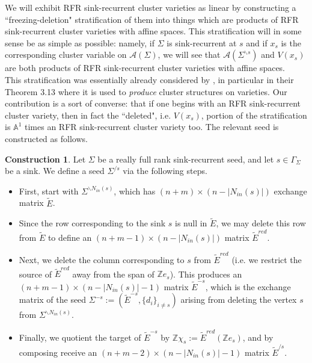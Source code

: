 \documentclass[11pt]{amsart}
\theoremstyle{definition}
\newtheorem{con}[thm]{Construction}
\theoremstyle{remark}
\numberwithin{equation}{section}
\begin{document}
We will exhibit RFR sink-recurrent cluster varieties as linear by constructing a ``freezing-deletion" stratification of them into things which are products of RFR sink-recurrent cluster varieties with affine spaces. This stratification will in some sense be as simple as possible: namely, if $\Sigma$ is sink-recurrent at $s$ and if $x_s$ is the corresponding cluster variable on $\mathcal{A}(\Sigma)$, we will see that $\mathcal{A}(\Sigma^{\backslash s})$ and $V(x_s)$ are both products of RFR sink-recurrent cluster varieties with affine spaces.\\

This stratification was essentially already considered by \cite{galashin2026braid}, in particular in their Theorem 3.13 where it is used to \textit{produce} cluster structures on varieties. Our contribution is a sort of converse: that if one begins with an RFR sink-recurrent cluster variety, then in fact the ``deleted", i.e. $V(x_s)$, portion of the stratification is $\mathbb{A}^1$ times an RFR sink-recurrent cluster variety too. The relevant seed is constructed as follows.

\begin{con}
    Let $\Sigma$ be a really full rank sink-recurrent seed, and let $s \in \Gamma_\Sigma$ be a sink. We define a seed $\Sigma^{/s}$ via the following steps.

    \begin{itemize}
        \item First, start with $\Sigma^{\backslash N_{in}(s)}$, which has $(n + m) \times (n - |N_{in}(s)|)$ exchange matrix $\tilde{E}$.
        \item Since the row corresponding to the sink $s$ is null in $\tilde{E}$, we may delete this row from $\tilde{E}$ to define an $(n + m - 1) \times (n - |N_{in}(s)|)$ matrix $\tilde{E}^{red}$.
        \item Next, we delete the column corresponding to $s$ from $\tilde{E}^{red}$ (i.e. we restrict the source of $\tilde{E}^{red}$ away from the span of $\mathbb{Z}e_s$). This produces an $(n + m - 1) \times (n - |N_{in}(s)| - 1)$ matrix $\tilde{E}^{-s}$, which is the exchange matrix of the seed $\Sigma^{-s} := (\tilde{E}^{-s}, \{d_i\}_{i \neq s})$ arising from deleting the vertex $s$ from $\Sigma^{\backslash N_{in}(s)}$.
        \item Finally, we quotient the target of $\tilde{E}^{-s}$ by $\mathbb{Z}\chi_s := \tilde{E}^{red}(\mathbb{Z}e_s)$, and by composing receive an $(n + m - 2) \times (n - |N_{in}(s)| - 1)$ matrix $\tilde{E}^{/s}$.
    \end{itemize}
\end{con}
\end{document}
